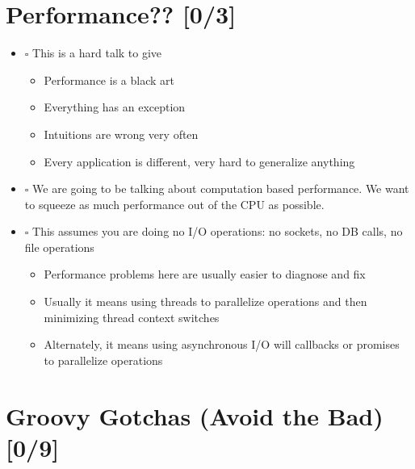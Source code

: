\documentclass[11pt]{article}
\begin{document}
\section{Performance?? [0/3]}
\label{sec:orgheadline4}

\begin{itemize}
\item $\square$ This is a hard talk to give

\begin{itemize}
\item Performance is a black art

\item Everything has an exception

\item Intuitions are wrong very often

\item Every application is different, very hard to generalize anything
\end{itemize}

\item $\square$ We are going to be talking about computation based performance. We want to squeeze as much performance out of the CPU as possible.

\item $\square$ This assumes you are doing no I/O operations: no sockets, no DB calls, no file operations

\begin{itemize}
\item Performance problems here are usually easier to diagnose and fix

\item Usually it means using threads to parallelize operations and then minimizing thread context switches

\item Alternately, it means using asynchronous I/O will callbacks or promises to parallelize operations
\end{itemize}
\end{itemize}

\section{Groovy Gotchas (Avoid the Bad) [0/9]}
\label{sec:orgheadline5}
\end{document}
